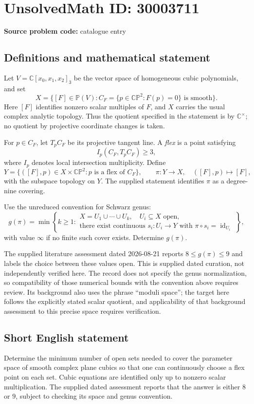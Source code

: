 \documentclass[11pt]{article}
\newcommand{\C}{\mathbb{C}}
\newcommand{\PP}{\mathbb{P}}
\begin{document}
\section*{UnsolvedMath ID: 30003711}
\textbf{Source problem code:} catalogue entry
\subsection{Definitions and mathematical statement}
Let \(V=\C[x_0,x_1,x_2]_3\) be the vector space of homogeneous cubic polynomials, and set
\[
X=\{[F]\in\PP(V): C_F=\{p\in\mathbb{CP}^2:F(p)=0\}\text{ is smooth}\}.
\]
Here \([F]\) identifies nonzero scalar multiples of \(F\), and \(X\) carries the usual complex analytic topology. Thus the quotient specified in the statement is by \(\C^\times\); no quotient by projective coordinate changes is taken.

For \(p\in C_F\), let \(T_pC_F\) be its projective tangent line. A \emph{flex} is a point satisfying
\[
I_p(C_F,T_pC_F)\geq 3,
\]
where \(I_p\) denotes local intersection multiplicity. Define
\[
Y=\{([F],p)\in X\times\mathbb{CP}^2:p\text{ is a flex of }C_F\},\qquad
\pi:Y\longrightarrow X,\quad ([F],p)\longmapsto[F],
\]
with the subspace topology on \(Y\). The supplied statement identifies \(\pi\) as a degree-nine covering.

Use the unreduced convention for Schwarz genus:
\[
g(\pi)=\min\left\{k\geq1:\begin{array}{l}
X=U_1\cup\cdots\cup U_k,\quad U_i\subseteq X\text{ open},\\
\text{there exist continuous }s_i:U_i\to Y\text{ with }\pi\circ s_i=\operatorname{id}_{U_i}
\end{array}\right\},
\]
with value \(\infty\) if no finite such cover exists. Determine \(g(\pi)\).

The supplied literature assessment dated 2026-08-21 reports \(8\leq g(\pi)\leq9\) and labels the choice between these values open. This is supplied dated curation, not independently verified here. The record does not specify the genus normalization, so compatibility of those numerical bounds with the convention above requires review. Its background also uses the phrase ``moduli space''; the target here follows the explicitly stated scalar quotient, and applicability of that background assessment to this precise space requires verification.
\subsection{Short English statement}
Determine the minimum number of open sets needed to cover the parameter space of smooth complex plane cubics so that one can continuously choose a flex point on each set. Cubic equations are identified only up to nonzero scalar multiplication. The supplied dated assessment reports that the answer is either \(8\) or \(9\), subject to checking its space and genus convention.
\end{document}

